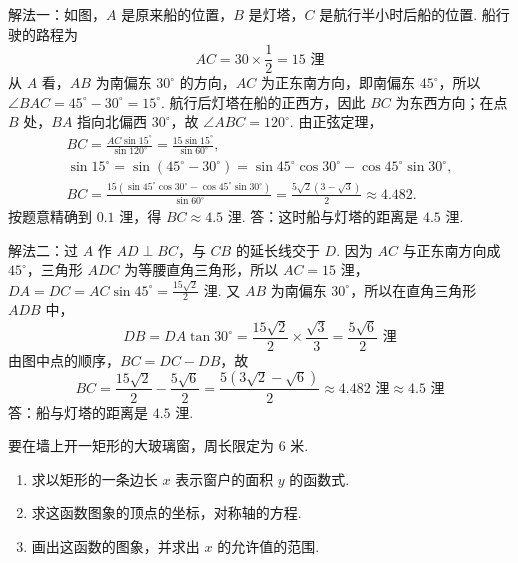 \begin{solution}
解法一：如图，\(A\) 是原来船的位置，\(B\) 是灯塔，\(C\) 是航行半小时后船的位置. 船行驶的路程为
\[
AC=30\times\frac12=15\text{ 浬}
\]
从 \(A\) 看，\(AB\) 为南偏东 \(30^{\circ}\) 的方向，\(AC\) 为正东南方向，即南偏东 \(45^{\circ}\)，所以 \(\angle BAC=45^{\circ}-30^{\circ}=15^{\circ}\). 航行后灯塔在船的正西方，因此 \(BC\) 为东西方向；在点 \(B\) 处，\(BA\) 指向北偏西 \(30^{\circ}\)，故 \(\angle ABC=120^{\circ}\). 由正弦定理，
\[
\begin{gathered}
BC=\frac{AC\sin15^{\circ}}{\sin120^{\circ}}=\frac{15\sin15^{\circ}}{\sin60^{\circ}},\\
\sin15^{\circ}=\sin(45^{\circ}-30^{\circ})=\sin45^{\circ}\cos30^{\circ}-\cos45^{\circ}\sin30^{\circ},\\
BC=\frac{15(\sin45^{\circ}\cos30^{\circ}-\cos45^{\circ}\sin30^{\circ})}{\sin60^{\circ}}=\frac{5\sqrt2(3-\sqrt3)}{2}\approx4.482.
\end{gathered}
\]
按题意精确到 \(0.1\text{ 浬}\)，得 \(BC\approx4.5\text{ 浬}\). 答：这时船与灯塔的距离是 \(4.5\text{ 浬}\).

解法二：过 \(A\) 作 \(AD\perp BC\)，与 \(CB\) 的延长线交于 \(D\). 因为 \(AC\) 与正东南方向成 \(45^{\circ}\)，三角形 \(ADC\) 为等腰直角三角形，所以
\(AC=15\text{ 浬}\)，\(DA=DC=AC\sin45^{\circ}=\frac{15\sqrt2}{2}\text{ 浬}\).
又 \(AB\) 为南偏东 \(30^{\circ}\)，所以在直角三角形 \(ADB\) 中，
\[
DB=DA\tan30^{\circ}=\frac{15\sqrt2}{2}\times\frac{\sqrt3}{3}=\frac{5\sqrt6}{2}\text{ 浬}
\]
由图中点的顺序，\(BC=DC-DB\)，故
\[
BC=\frac{15\sqrt2}{2}-\frac{5\sqrt6}{2}=\frac{5(3\sqrt2-\sqrt6)}{2}\approx4.482\text{ 浬}\approx4.5\text{ 浬}
\]
答：船与灯塔的距离是 \(4.5\text{ 浬}\).
\end{solution}

\begin{problem}
要在墙上开一矩形的大玻璃窗，周长限定为 \(6\text{ 米}\).

\begin{enumerate}
\item 求以矩形的一条边长 \(x\) 表示窗户的面积 \(y\) 的函数式.
\item 求这函数图象的顶点的坐标，对称轴的方程.
\item 画出这函数的图象，并求出 \(x\) 的允许值的范围.
\end{enumerate}
\end{problem}

